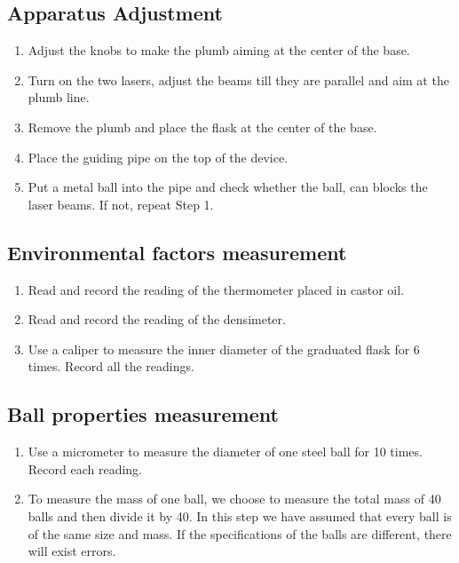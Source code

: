\documentclass[12pt,a4paper]{article}
\begin{document}
\subsection{Apparatus Adjustment}
\begin{enumerate}
    \item Adjust the knobs to make the plumb aiming at the center of the base.
    \item Turn on the two lasers, adjust the beams till they are parallel and aim at the plumb line.
    \item Remove the plumb and place the flask at the center of the base.
    \item Place the guiding pipe on the top of the device.
    \item Put a metal ball into the pipe and check whether the ball,  can blocks the laser beams. If not, repeat Step 1.
\end{enumerate}

\subsection{ Environmental factors measurement}
\begin{enumerate}
    \item Read and record the reading of the thermometer placed in castor oil.
    \item Read and record the reading of the densimeter.
    \item Use a caliper to measure the inner diameter of the graduated flask for 6 times. Record all the readings. 
\end{enumerate}

\subsection{Ball properties measurement}
\begin{enumerate}
    \item Use a micrometer to measure the diameter of one steel ball for 10 times. Record each reading. 
    \item To measure the mass of one ball, we choose to measure the total mass of 40 balls and then divide it by 40. In this step we have assumed that every ball is of the same size and mass. If the specifications of the balls are different, there will exist errors.
\end{enumerate}
\end{document}
